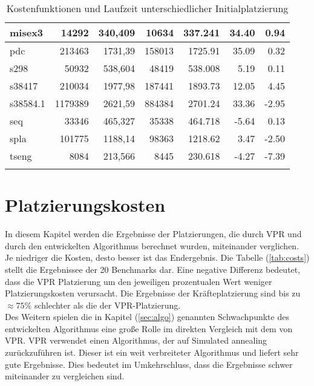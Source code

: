 \begin{center}
\begin{longtable}{| l | r | r | r | r | r | r |}
                    misex3      &   14292   &   340,409     &   10634       &    337.241    & 34.40     & 0.94   \\ \hline        
                    pdc         &   213463  &   1731,39     &   158013      &    1725.91    & 35.09     & 0.32   \\ \hline        
                    s298        &   50932   &   538,604     &   48419       &    538.008    & 5.19      & 0.11   \\ \hline        
                    s38417      &   210034  &   1977,98     &   187441      &    1893.73    & 12.05     & 4.45   \\ \hline        
                    s38584.1    &   1179389 &   2621,59     &   884384      &    2701.24    & 33.36     & -2.95   \\ \hline        
                    seq         &   33346   &   465,327     &   35338       &    464.718    & -5.64     & 0.13   \\ \hline        
                    spla        &   101775  &   1188,14     &   98363       &    1218.62    & 3.47      & -2.50   \\ \hline        
                    tseng       &   8084    &   213,566     &   8445        &    230.618    & -4.27     & -7.39   \\ \hline        
                \caption{Kostenfunktionen und Laufzeit unterschiedlicher Initialplatzierung}
                \label{tab:init}
            \end{longtable}
        \end{center}



    \section{Platzierungskosten}\label{sec:result-costs}

        In diesem Kapitel werden die Ergebnisse der Platzierungen,
        die durch VPR und durch den entwickelten Algorithmus berechnet wurden, miteinander verglichen.
        Je niedriger die Kosten, desto besser ist das Endergebnis. Die Tabelle (\ref{tab:costs})
        stellt die Ergebnissee der 20 Benchmarks dar. Eine negative Differenz bedeutet,
        dass die VPR Platzierung um den jeweiligen prozentualen Wert weniger Platzierungskosten verursacht.
        Die Ergebnisse der Kräfteplatzierung sind bis zu $\approx 75 \%$
        schlechter als die der VPR-Platzierung.\\
        Des Weitern spielen die in Kapitel (\ref{sec:algo}) genannten Schwachpunkte des entwickelten
        Algorithmus eine große Rolle im direkten Vergleich mit dem von VPR.
        VPR verwendet einen Algorithmus, der auf Simulated annealing zurückzuführen ist.
        Dieser ist ein weit verbreiteter Algorithmus und liefert sehr gute Ergebnisse.
        Dies bedeutet im Umkehrschluss, dass die Ergebnisse schwer miteinander zu vergleichen sind. 

